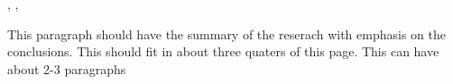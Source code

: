 \newpage

\begin{spacing}{1}

\begin{center} 
    {\expandafter\MakeUppercase{\textbf{\projectTitle}}}

    \vspace{2em}

    {\textbf{\nameWithInitials}}

    \vspace{1em}

    {\fontsize{10pt}{0pt}\selectfont
        \departmentName, \universityName, \universityCountry
    }   
\end{center}

\vspace{2em}

{This paragraph should have the summary of the reserach with emphasis on the conclusions. This should fit in about three quaters of this page. This can have about 2-3 paragraphs} 
 
\end{spacing}
